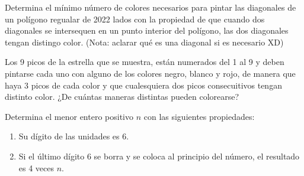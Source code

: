 \begin{problem}
    Determina el mínimo número de colores necesarios para pintar las diagonales de un polígono regualar de 2022 lados con la propiedad de que cuando dos diagonales se intersequen en un punto interior del polígono, las dos diagonales tengan distingo color. (Nota: aclarar qué es una diagonal si es necesario XD)
\end{problem}

\begin{problem}
    Los 9 picos de la estrella que se muestra, están numerados del 1 al 9 y deben pintarse cada uno con alguno de los colores negro, blanco y rojo, de manera que haya 3 picos de cada color y que cualesquiera dos picos consecuitivos tengan distinto color. ¿De cuántas maneras distintas pueden colorearse?
\end{problem}

\begin{problem}
    Determina el menor entero positivo $n$ con las siguientes propiedades:
    \begin{enumerate}
        \item Su dígito de las unidades es 6.
        \item Si el último dígito 6 se borra y se coloca al principio del número, el resultado es 4 veces $n$.
    \end{enumerate}
\end{problem}